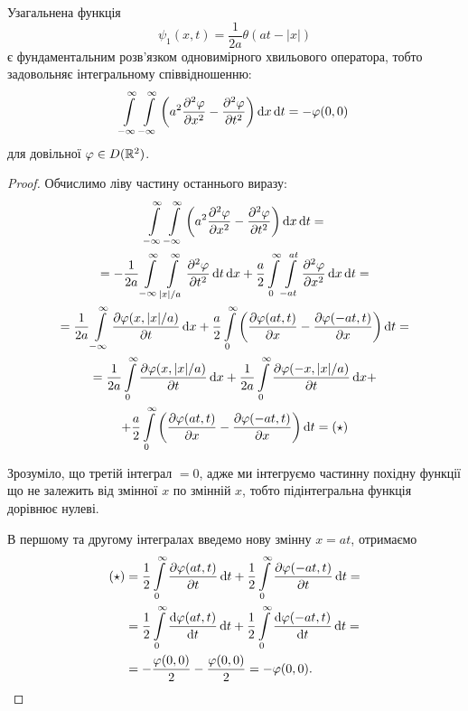 \begin{theorem}
	Узагальнена функція
	\begin{equation}
		\psi_1(x, t) = \frac{1}{2a}\theta(at-|x|)
	\end{equation}
	є фундаментальним розв'язком одновимірного хвильового оператора, тобто задовольняє інтегральному співвідношенню:
	\begin{equation}
		\displaystyle\int\limits_{-\infty}^\infty \displaystyle\int\limits_{-\infty}^\infty \left(a^2\frac{\partial^2\varphi}{\partial x^2}-\frac{\partial^2\varphi}{\partial t^2}\right)\mathop{}\!\mathrm{d} x\mathop{}\!\mathrm{d} t = - \varphi(0, 0)
	\end{equation}
	для довільної $\varphi \in D(\mathbb{R}^2)$.
\end{theorem}

\begin{proof}
	Обчислимо ліву частину останнього виразу:
	\begin{multline}
		\Int_{-\infty}^\infty \Int_{-\infty}^\infty \left(a^2\frac{\partial^2\phi}{\partial x^2}-\frac{\partial^2\phi}{\partial t^2}\right)\diff x\diff t = \\
		= -\frac{1}{2a} \Int_{-\infty}^\infty \Int_{|x|/a}^\infty \frac{\partial^2 \phi}{\partial t^2} \diff t\diff x + \frac{a}{2} \Int_0^\infty \Int_{-at}^{at} \frac{\partial^2 \phi}{\partial x^2} \diff x \diff t = \\
		= \frac{1}{2a}\Int_{-\infty}^\infty \frac{\partial \phi(x,|x|/a)}{\partial t}\diff x + \frac{a}{2}\Int_0^\infty\left(\frac{\partial\phi(at,t)}{\partial x}-\frac{\partial \phi(-at,t)}{\partial x}\right)\diff t=\\
		= \frac{1}{2a}\Int_0^\infty \frac{\partial \phi(x,|x|/a)}{\partial t}\diff x + \frac{1}{2a}\Int_0^\infty \frac{\partial \phi(-x,|x|/a)}{\partial t}\diff x +\\
		+\frac{a}{2}\Int_0^\infty\left(\frac{\partial\phi(at,t)}{\partial x}-\frac{\partial \phi(-at,t)}{\partial x}\right)\diff t = (\star)
	\end{multline}

	\begin{remark}
		Зрозуміло, що третій інтеграл $= 0$, адже ми інтегруємо частинну похідну функції що не залежить від змінної $x$ по змінній $x$, тобто підінтегральна функція дорівнює нулеві.
	\end{remark}

	В першому та другому інтегралах введемо нову змінну $x = a t$, отримаємо 
	\begin{equation}
		\begin{aligned}
			(\star) &= \frac{1}{2} \Int_0^\infty \frac{\partial \phi(at,t)}{\partial t}\diff t + \frac{1}{2} \Int_0^\infty \frac{\partial \phi(-at,t)}{\partial t}\diff t = \\
			&= \frac{1}{2} \Int_0^\infty \frac{\diff \phi(at,t)}{\diff t}\diff t + \frac{1}{2} \Int_0^\infty \frac{\diff \phi(-at,t)}{\diff t}\diff t = \\
			&= - \frac{\phi(0,0)}{2} - \frac{\phi(0,0)}{2} = - \phi(0,0).
		\end{aligned}
	\end{equation}


\end{proof}

